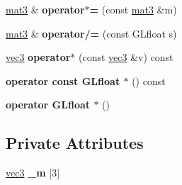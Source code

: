 \begin{DoxyCompactItemize}
\item 
\hypertarget{class_angel_1_1mat3_ace9e4a45d3dc4ad3d6d05474159e75f9}{\hyperlink{class_angel_1_1mat3}{mat3} \& {\bfseries operator$\ast$=} (const \hyperlink{class_angel_1_1mat3}{mat3} \&m)}\label{class_angel_1_1mat3_ace9e4a45d3dc4ad3d6d05474159e75f9}

\item 
\hypertarget{class_angel_1_1mat3_a72b528f838b9a7c25daeda95c2e54431}{\hyperlink{class_angel_1_1mat3}{mat3} \& {\bfseries operator/=} (const G\-Lfloat s)}\label{class_angel_1_1mat3_a72b528f838b9a7c25daeda95c2e54431}

\item 
\hypertarget{class_angel_1_1mat3_a816f9f6ba6cbebea56b0f84432643e4a}{\hyperlink{struct_angel_1_1vec3}{vec3} {\bfseries operator$\ast$} (const \hyperlink{struct_angel_1_1vec3}{vec3} \&v) const }\label{class_angel_1_1mat3_a816f9f6ba6cbebea56b0f84432643e4a}

\item 
\hypertarget{class_angel_1_1mat3_a1d8dde0ed668c30af292f9b53253dec9}{{\bfseries operator const G\-Lfloat $\ast$} () const }\label{class_angel_1_1mat3_a1d8dde0ed668c30af292f9b53253dec9}

\item 
\hypertarget{class_angel_1_1mat3_a5b68f66855c70b79a86a3ddc65acda6f}{{\bfseries operator G\-Lfloat $\ast$} ()}\label{class_angel_1_1mat3_a5b68f66855c70b79a86a3ddc65acda6f}

\end{DoxyCompactItemize}
\subsection*{Private Attributes}
\begin{DoxyCompactItemize}
\item 
\hypertarget{class_angel_1_1mat3_a937bb5305c6e023812a87d0a329546b0}{\hyperlink{struct_angel_1_1vec3}{vec3} {\bfseries \-\_\-m} \mbox{[}3\mbox{]}}\label{class_angel_1_1mat3_a937bb5305c6e023812a87d0a329546b0}

\end{DoxyCompactItemize}

